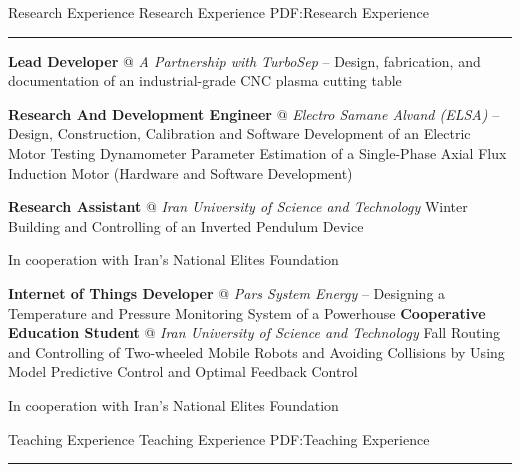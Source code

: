 \documentclass[letterpaper,MMMyyyy]{CVTemplate}
\begin{document}
\begin{Body}
\Section
{Research Experience}
{Research Experience}
{PDF:Research Experience}
\textcolor{Forestg}{\vspace{0.10cm}\hrule height 0.1cm}\BigGap\Gap\Gap
\Entry
\textbf{Lead Developer} @ \textit{A Partnership with TurboSep}
\hfill
\textcolor{OrangeY}{ – }
\Gap
\BulletItem
Design, fabrication, and documentation of an industrial-grade CNC plasma cutting table

\Entry
\vspace{6pt}
\textbf{Research And Development Engineer} @ \textit{Electro Samane Alvand (ELSA)}
\hfill
\textcolor{OrangeY}{ – }
\Gap
\BulletItem
Design, Construction, Calibration and Software Development of an Electric Motor Testing Dynamometer 
\BulletItem
Parameter Estimation of a Single-Phase Axial Flux Induction Motor (Hardware and Software Development) 


\Entry
\vspace{6pt}
\textbf{Research Assistant} @ \textit{Iran University of Science and Technology}
\hfill
\textcolor{OrangeY}{Winter }
\Gap
\BulletItem
Building and Controlling of an Inverted Pendulum Device
\begin{Detail}
	\qquad In cooperation with Iran's National Elites Foundation
\end{Detail}


\Entry
\vspace{6pt}
\textbf{Internet of Things Developer} @ \textit{Pars System Energy}
\hfill
\textcolor{OrangeY}{\textcolor{OrangeY}{ –
}}
\Gap
\BulletItem
Designing a Temperature and Pressure Monitoring System of a Powerhouse
\Entry
\vspace{6pt}
\textbf{Cooperative Education Student} @ \textit{Iran University of Science and Technology}
\hfill
\textcolor{OrangeY}{Fall }
\Gap
\BulletItem
Routing and Controlling of Two-wheeled Mobile Robots and Avoiding Collisions by Using Model Predictive Control and Optimal Feedback Control
\begin{Detail}
	\qquad In cooperation with Iran's National Elites Foundation
\end{Detail}
\vspace{15pt}

\Section
{Teaching Experience}
{Teaching Experience}
{PDF:Teaching Experience}
\textcolor{Forestg}{\vspace{0.10cm}\hrule height 0.1cm}\BigGap\Gap


\end{Body}
\end{document}
